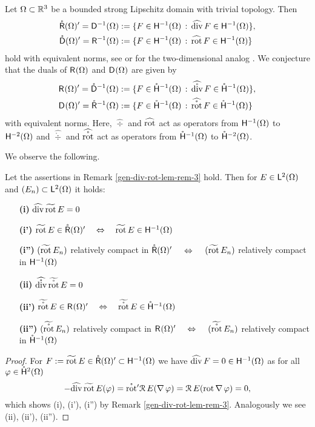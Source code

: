 \documentclass[a4paper]{amsart}
\newcommand{\hmoc}{\mathring\hsymbol^{-1}}
\newcommand{\hmtc}{\mathring\hsymbol^{-2}}
\newcommand{\hmocom}{\hmoc(\om)}
\newcommand{\hmtcom}{\hmtc(\om)}
\newcommand{\htc}{\mathring\hsymbol^2}
\renewcommand{\R}{\mathcal{R}}
\renewcommand{\rotc}{\mathring\rot}
\renewcommand{\divc}{\mathring\div}
\begin{document}
\begin{rem}
Let $\Omega\subset\mathbb{R}^{3}$ be a bounded strong Lipschitz domain with trivial topology. Then
\begin{align*}
\mathring{\mathsf{R}}(\Omega)'
=\mathsf{D}^{-1}(\Omega)
&:=\{F\in\overset{}{\mathsf{H}}{}^{-1}_{}(\Omega)\,:\,\widehat{\operatorname{div}}\,F\in\overset{}{\mathsf{H}}{}^{-1}_{}(\Omega)\},\\
\mathring{\mathsf{D}}(\Omega)'
=\mathsf{R}^{-1}(\Omega)
&:=\{F\in\overset{}{\mathsf{H}}{}^{-1}_{}(\Omega)\,:\,\widehat{\operatorname{rot}}\,F\in\overset{}{\mathsf{H}}{}^{-1}_{}(\Omega)\}
\end{align*}
hold with equivalent norms,
see \cite{paulyzulehner2018b} or for the two-dimensional analog
\cite{braessbook}.
We conjecture that the duals of $\overset{}{\mathsf{R}}{}^{}_{}(\Omega)$ and $\overset{}{\mathsf{D}}{}^{}_{}(\Omega)$ are given by
\begin{align*}
\rom'=\mathring{\mathsf{D}}^{-1}(\om)
&:=\set{F\in\hmocom}{\widehat{\divc}\,F\in\hmocom},\\
\dom'=\mathring{\mathsf{R}}^{-1}(\om)
&:=\set{F\in\hmocom}{\widehat{\rotc}\,F\in\hmocom}
\end{align*}
with equivalent norms.
Here, $\widehat{\div}$ and $\widehat{\operatorname{rot}}$ act as operators from $\overset{}{\mathsf{H}}{}^{-1}_{}(\Omega)$ to $\overset{}{\mathsf{H}}{}^{-2}_{}(\Omega)$
and $\widehat{\divc}$ and $\widehat{\rotc}$ act as operators from $\hmocom$ to $\hmtcom$.
\end{rem}

We observe the following.

\begin{lem}
Let the assertions in Remark \ref{gen-div-rot-lem-rem-3} hold. 
Then for $E\in\overset{}{\mathsf{L}}{}^{2}_{}(\Omega)$ and $(E_{n})\subset\overset{}{\mathsf{L}}{}^{2}_{}(\Omega)$ it holds:
\begin{itemize}
\item[\bf(i)]
$\widehat{\operatorname{div}}\,\widetilde{\operatorname{rot}}\,E=0$
\item[\bf(i')]
$\widetilde{\operatorname{rot}}\,E\in\mathring{\mathsf{R}}(\Omega)'\quad\Leftrightarrow\quad\widetilde{\operatorname{rot}}\,E\in\overset{}{\mathsf{H}}{}^{-1}_{}(\Omega)$
\item[\bf(i'')]
$(\widetilde{\operatorname{rot}}\,E_{n})$ relatively compact in $\mathring{\mathsf{R}}(\Omega)'$
$\quad\Leftrightarrow\quad$
$(\widetilde{\operatorname{rot}}\,E_{n})$ relatively compact in $\overset{}{\mathsf{H}}{}^{-1}_{}(\Omega)$
\item[\bf(ii)]
$\widehat{\divc}\,\widetilde{\rotc}\,E=0$
\item[\bf(ii')]
$\widetilde{\rotc}\,E\in\rom'\qequi\widetilde{\rotc}\,E\in\hmocom$
\item[\bf(ii'')]
$(\widetilde{\rotc}\,E_{n})$ relatively compact in $\overset{}{\mathsf{R}}{}^{}_{}(\Omega)'$
$\quad\Leftrightarrow\quad$
$(\widetilde{\rotc}\,E_{n})$ relatively compact in $\hmocom$
\end{itemize}
\end{lem}

\begin{proof}
For $F:=\widetilde{\operatorname{rot}}\,E\in\mathring{\mathsf{R}}(\Omega)'\subset\overset{}{\mathsf{H}}{}^{-1}_{}(\Omega)$ 
we have $\widehat{\operatorname{div}}\,F=0\in\overset{}{\mathsf{H}}{}^{-1}_{}(\Omega)$ as for all $\varphi\in\htc(\om)$
$$-\widehat{\div}\,\widetilde{\rot}\,E(\varphi)
=\rotc{}'\R\,E(\na\varphi)
=\R\,E(\rot\na\varphi)
=0,$$
which shows (i), (i'), (i'') by Remark \ref{gen-div-rot-lem-rem-3}.
Analogously we see (ii), (ii'), (ii'').
\end{proof}
\end{document}
